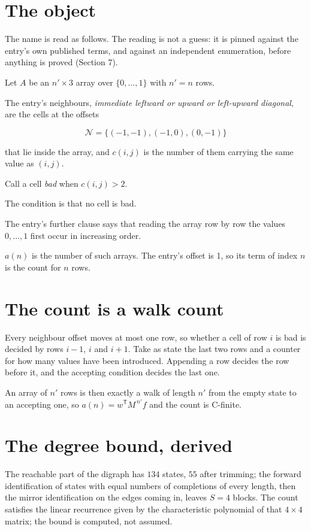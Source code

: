\documentclass[11pt]{article}
\theoremstyle{definition}
\begin{document}
\section{The object}

The name is read as follows. The reading is not a guess: it is pinned against the entry's own published terms, and against an independent enumeration, before anything is proved (Section 7).

Let $A$ be an $n' \times 3$ array over $\{0,\dots,1\}$ with $n' = n$ rows.

The entry's neighbours, {\itshape immediate leftward or upward or left-upward diagonal}, are the cells at the offsets

\[\mathcal{N} = \{(-1,-1), (-1,0), (0,-1)\}\]

that lie inside the array, and $c(i,j)$ is the number of them carrying the same value as $(i,j)$.

Call a cell {\itshape bad} when $c(i,j) > 2$.

The condition is that no cell is bad.

The entry's further clause says that reading the array row by row the values $0,\dots,1$ first occur in increasing order.

$a(n)$ is the number of such arrays. The entry's offset is 1, so its term of index $n$ is the count for $n$ rows.

\section{The count is a walk count}

Every neighbour offset moves at most one row, so whether a cell of row $i$ is bad is decided by rows $i-1$, $i$ and $i+1$. Take as state the last two rows and a counter for how many values have been introduced. Appending a row decides the row before it, and the accepting condition decides the last one.

An array of $n'$ rows is then exactly a walk of length $n'$ from the empty state to an accepting one, so $a(n) = w^{\mathsf T}M^{\,n'}f$ and the count is C-finite.

\section{The degree bound, derived}

The reachable part of the digraph has $134$ states, $55$ after trimming; the forward identification of states with equal numbers of completions of every length, then the mirror identification on the edges coming in, leaves $S = 4$ blocks. The count satisfies the linear recurrence given by the characteristic polynomial of that $4\times4$ matrix; the bound is computed, not assumed.
\end{document}
